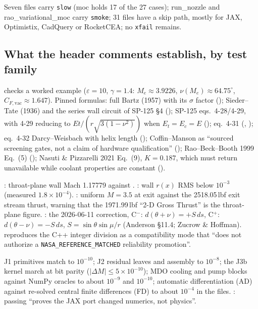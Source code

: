 Seven files carry \texttt{slow} (moc holds 17 of the 27 cases); run\_nozzle and rao\_variational\_moc carry \texttt{smoke}; 31 files have a skip path, mostly for JAX, Optimistix, CadQuery or RocketCEA; no \texttt{xfail} remains.

\subsection{What the header comments establish, by test family}
 checks a worked example ($\varepsilon=10$, $\gamma=1.4$: $M_e\approx3.9226$, $\nu(M_e)\approx64.75^\circ$, $C_{F,\text{vac}}\approx1.647$). Pinned formulas: full Bartz (1957) with its $\sigma$ factor (); Sieder--Tate (1936) and the series wall circuit of SP-125 \S4 (); SP-125 eqs.\ 4-28/4-29, with 4-29 reducing to $Et/(r\sqrt{3(1-\nu^2)})$ when $E_t=E_c=E$ (); eq.\ 4-31 (, ); eq.\ 4-32 Darcy--Weisbach with helix length (); Coffin--Manson as ``sourced screening gates, not a claim of hardware qualification'' (); Rao--Beck--Booth 1999 Eq.~(5) (); Nasuti \& Pizzarelli 2021 Eq.~(9), $K=0.187$, which must return unavailable while coolant properties are constant ().

: throat-plane wall Mach 1.17779 against . : wall $r(x)$ RMS below $10^{-3}$ (measured $1.8\times10^{-4}$). : uniform $M=3.5$ at exit against the 2518.05\,lbf exit stream thrust, warning that the 1971.99\,lbf ``2-D Gross Thrust'' is the throat-plane figure. : the 2026-06-11 correction, C$^-$: $d(\theta+\nu)=+S\,ds$, C$^+$: $d(\theta-\nu)=-S\,ds$, $S=\sin\theta\sin\mu/r$ (Anderson \S11.4; Zucrow \& Hoffman).  reproduces the C++ integer division as a compatibility mode that ``does not authorize a \texttt{NASA\_REFERENCE\_MATCHED} reliability promotion''.

J1 primitives match to $10^{-10}$; J2 residual leaves and assembly to $10^{-8}$; the J3b kernel march at bit parity ($|\Delta M|\le5\times10^{-10}$); MDO cooling and pump blocks against NumPy oracles to about $10^{-9}$ and $10^{-10}$; automatic differentiation (AD) against re-solved central finite differences (FD) to about $10^{-4}$ in the  files. : passing ``proves the JAX port changed numerics, not physics''.

